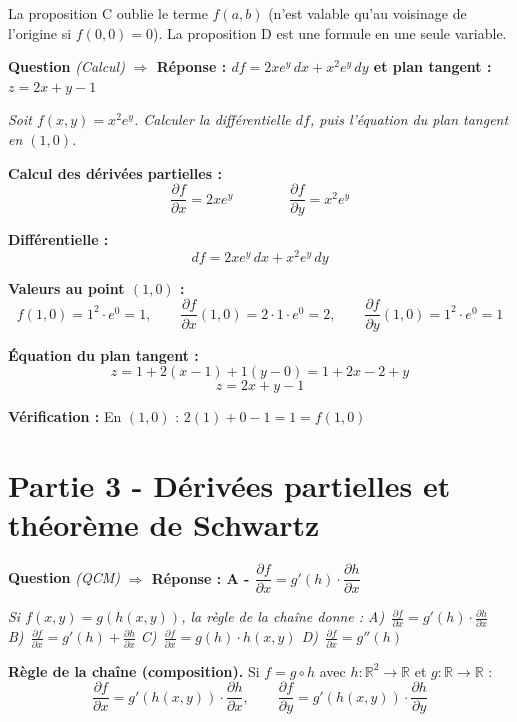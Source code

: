 \documentclass[11pt,a4paper]{article}
\newcounter{qnum}
\newcommand{\qtitre}[2]{%
  \stepcounter{qnum}%
  \medskip\noindent
  \textbf{\color{bleutexte}Question \theqnum}\enspace
  \textit{(#1)}\enspace
  \textcolor{vertok}{\textbf{$\Rightarrow$ Réponse : #2}}
  \par\smallskip
}
\newcommand{\qenonce}[1]{%
  \begin{mdframed}[backgroundcolor=grisbox, linewidth=0pt,
    innerleftmargin=8pt, innerrightmargin=8pt,
    innertopmargin=5pt, innerbottommargin=5pt,
    skipabove=2pt, skipbelow=4pt]
  \small\textit{#1}
  \end{mdframed}
}
\begin{document}
La proposition C oublie le terme $f(a,b)$ (n'est valable qu'au voisinage de l'origine si $f(0,0)=0$). La proposition D est une formule en une seule variable.

\qtitre{Calcul}{$df = 2xe^y\,dx + x^2e^y\,dy$ \quad et \quad plan tangent : $z = 2x+y-1$}
\qenonce{Soit $f(x,y) = x^2 e^y$. Calculer la différentielle $df$, puis l'équation du plan tangent en $(1,0)$.}

\begin{reponsebox}
\textbf{Calcul des dérivées partielles :}
$$\frac{\partial f}{\partial x} = 2xe^y \qquad\qquad \frac{\partial f}{\partial y} = x^2e^y$$

\textbf{Différentielle :}
$$\boxed{df = 2xe^y\,dx + x^2e^y\,dy}$$

\textbf{Valeurs au point $(1,0)$ :}
$$f(1,0) = 1^2\cdot e^0 = 1,\qquad \frac{\partial f}{\partial x}(1,0) = 2\cdot 1\cdot e^0 = 2,\qquad \frac{\partial f}{\partial y}(1,0) = 1^2\cdot e^0 = 1$$

\textbf{Équation du plan tangent :}
$$z = 1 + 2(x-1) + 1(y-0) = 1 + 2x - 2 + y$$
$$\boxed{z = 2x + y - 1}$$

\textbf{Vérification :} En $(1,0)$ : $2(1)+0-1 = 1 = f(1,0)$ \checkmark
\end{reponsebox}

\section{Partie 3 - Dérivées partielles et théorème de Schwartz}

\qtitre{QCM}{A - $\dfrac{\partial f}{\partial x} = g'(h)\cdot\dfrac{\partial h}{\partial x}$}
\qenonce{Si $f(x,y)=g(h(x,y))$, la règle de la chaîne donne :
\quad A)~$\frac{\partial f}{\partial x} = g'(h)\cdot\frac{\partial h}{\partial x}$
\quad B)~$\frac{\partial f}{\partial x} = g'(h) + \frac{\partial h}{\partial x}$
\quad C)~$\frac{\partial f}{\partial x} = g(h)\cdot h(x,y)$
\quad D)~$\frac{\partial f}{\partial x} = g''(h)$}

\begin{methodebox}
\textbf{Règle de la chaîne (composition).} Si $f = g \circ h$ avec $h : \mathbb{R}^2 \to \mathbb{R}$ et $g : \mathbb{R} \to \mathbb{R}$ :
$$\frac{\partial f}{\partial x} = g'(h(x,y))\cdot\frac{\partial h}{\partial x}, \qquad \frac{\partial f}{\partial y} = g'(h(x,y))\cdot\frac{\partial h}{\partial y}$$
\end{methodebox}
\end{document}

